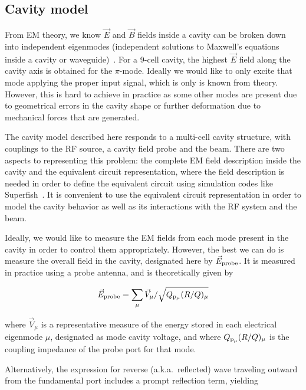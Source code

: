 \documentclass[a4paper,12pt]{article}
\begin{document}
\subsection{Cavity model}

From EM theory, we know $\vec{E}$ and $\vec{B}$ fields inside a cavity can be broken down into independent eigenmodes (independent solutions to Maxwell's equations inside a cavity or waveguide)~\cite{ref:wangler}. For a 9-cell cavity, the highest $\vec{E}$ field along the cavity axis is obtained for the $\pi$-mode. Ideally we would like to only excite that mode applying the proper input signal, which is only is known from theory. However, this is hard to achieve in practice as some other modes are present due to geometrical errors in the cavity shape or further deformation due to mechanical forces that are generated.

The cavity model described here responds to a multi-cell cavity structure, with couplings to the RF source, a cavity field probe and the beam. There are two aspects to representing this problem: the complete EM field description inside the cavity and the equivalent circuit representation, where the field description is needed in order to define the equivalent circuit using simulation codes like Superfish~\cite{ref:superfish}. It is convenient to use the equivalent circuit representation in order to model the cavity behavior as well as its interactions with the RF system and the beam.

Ideally, we would like to measure the EM fields from each mode present in the cavity in order to control them appropriately. However, the best  we can do is measure the overall field in the cavity, designated here by $\vec E_{\rm probe}$. It is measured in practice using a probe antenna, and is theoretically given by

\begin{equation}
  \vec E_{\rm probe} = \sum_{\mu} \vec{V}_{\mu} /\sqrt{Q_{\rm p_{\mu}}(R/Q)_{\mu}}
  \label{eq:E_probe}
\end{equation}

\noindent where $\vec{V}_{\mu}$ is a representative measure of the energy stored in each electrical eigenmode $\mu$, designated as mode cavity voltage, and where $Q_{\rm p_{\mu}}(R/Q)_{\mu}$ is the coupling impedance of the probe port for that mode.

Alternatively, the expression for reverse (a.k.a.~reflected) wave traveling outward from the fundamental port includes a prompt reflection term, yielding
\end{document}
